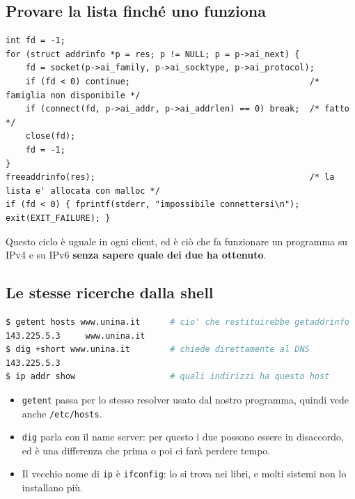 \subsection{Provare la lista finché uno funziona}

\begin{lstlisting}[language={[POSIX]C}, style=wnumbers, title={connect\_any: il ciclo da scrivere una volta e tenere}]
int fd = -1;
for (struct addrinfo *p = res; p != NULL; p = p->ai_next) {
    fd = socket(p->ai_family, p->ai_socktype, p->ai_protocol);
    if (fd < 0) continue;                                    /* famiglia non disponibile */
    if (connect(fd, p->ai_addr, p->ai_addrlen) == 0) break;  /* fatto */
    close(fd);
    fd = -1;
}
freeaddrinfo(res);                                           /* la lista e' allocata con malloc */
if (fd < 0) { fprintf(stderr, "impossibile connettersi\n"); exit(EXIT_FAILURE); }
\end{lstlisting}

Questo ciclo è uguale in ogni client, ed è ciò che fa funzionare un programma su IPv4 e su IPv6 \textbf{senza sapere quale
dei due ha ottenuto}.


\subsection{Le stesse ricerche dalla shell}

\begin{lstlisting}[language=bash]
$ getent hosts www.unina.it      # cio' che restituirebbe getaddrinfo
143.225.5.3     www.unina.it
$ dig +short www.unina.it        # chiede direttamente al DNS
143.225.5.3
$ ip addr show                   # quali indirizzi ha questo host
\end{lstlisting}

\begin{itemize}
    \item \texttt{getent} passa per lo stesso resolver usato dal nostro programma, quindi vede anche \texttt{/etc/hosts}.
    \item \texttt{dig} parla con il name server: per questo i due possono essere in disaccordo, ed è una differenza che prima
          o poi ci farà perdere tempo.
    \item Il vecchio nome di \texttt{ip} è \texttt{ifconfig}: lo si trova nei libri, e molti sistemi non lo installano più.
\end{itemize}

